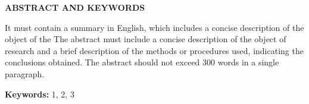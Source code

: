 \begin{center}
	{\titulodc \textbf{ABSTRACT AND KEYWORDS}}
\end{center}

It must contain a summary in English, which includes a concise description of the object of the The abstract must include a concise description of the object of research and a brief description of the methods or procedures used, indicating the conclusions obtained. The abstract should not exceed 300 words in a single paragraph. 

\textbf{Keywords:} 1, 2, 3
